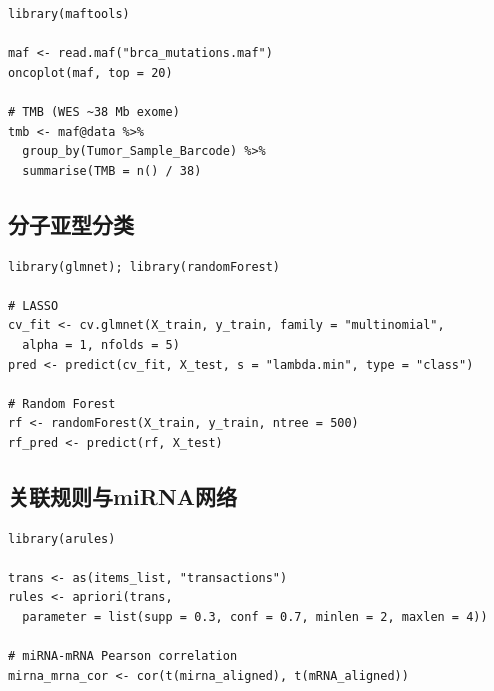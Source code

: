\documentclass[12pt,a4paper]{ctexart}
\begin{document}
\begin{lstlisting}[caption={maftools突变分析与TMB计算}]
library(maftools)

maf <- read.maf("brca_mutations.maf")
oncoplot(maf, top = 20)

# TMB (WES ~38 Mb exome)
tmb <- maf@data %>%
  group_by(Tumor_Sample_Barcode) %>%
  summarise(TMB = n() / 38)
\end{lstlisting}

\subsection{分子亚型分类}

\begin{lstlisting}[caption={LASSO多分类与随机森林}]
library(glmnet); library(randomForest)

# LASSO
cv_fit <- cv.glmnet(X_train, y_train, family = "multinomial",
  alpha = 1, nfolds = 5)
pred <- predict(cv_fit, X_test, s = "lambda.min", type = "class")

# Random Forest
rf <- randomForest(X_train, y_train, ntree = 500)
rf_pred <- predict(rf, X_test)
\end{lstlisting}

\subsection{关联规则与miRNA网络}

\begin{lstlisting}[caption={Apriori关联规则与miRNA-mRNA网络}]
library(arules)

trans <- as(items_list, "transactions")
rules <- apriori(trans,
  parameter = list(supp = 0.3, conf = 0.7, minlen = 2, maxlen = 4))

# miRNA-mRNA Pearson correlation
mirna_mrna_cor <- cor(t(mirna_aligned), t(mRNA_aligned))
\end{lstlisting}
\end{document}
